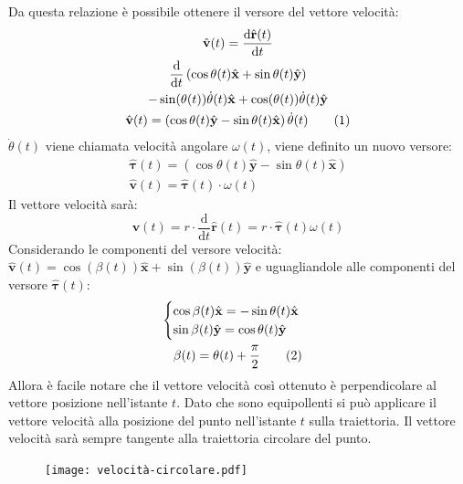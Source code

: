 \documentclass{article}
\newcommand{\vect}[1]{\boldsymbol{\mathbf{#1}}}
\newcommand{\df}{\mathrm{d}}
\numberwithin{equation}{subsection}
\begin{document}
Da questa relazione è possibile ottenere il versore del 
vettore velocità: 
\begin{gather*}
    \hat{\vect{v}}(t)=\displaystyle\frac{\df\hat{\vect{r}}(t)}{\df t}\\
    \displaystyle\frac{\df}{\df t}\left(\cos\theta(t)\hat{\vect{x}}+\sin\theta(t)\hat{\vect{y}}\right)\\
    -\sin(\theta(t))\dot\theta(t)\hat{\vect{x}}+\cos(\theta(t))\dot\theta(t)\hat{\vect{y}}\\
    \hat{\vect{v}}(t)=\left(\cos\theta(t)\hat{\vect{y}}-\sin\theta(t)\hat{\vect{x}}\right)\dot\theta(t)\tag{\stepcounter{equation}\theequation}
\end{gather*}
$\dot\theta(t)$ viene chiamata velocità angolare $\omega(t)$, 
viene definito un nuovo versore:
\begin{gather}
    \hat{\vect{\tau}}(t) =\left(\cos\theta(t)\hat{\vect{y}}-\sin\theta(t)\hat{\vect{x}}\right)\\
    \hat{\vect{v}}(t) =\hat{\vect{\tau}}(t)\cdot\omega(t)
\end{gather}
Il vettore velocità sarà: 
\begin{equation}
    \vect{v}(t)=r\cdot\frac{\df}{\df t}\hat{\vect{r}}(t)=r\cdot\hat{\vect{\tau}}(t)\omega(t)
\end{equation}
Considerando le componenti del versore velocità: 
$\hat{\vect{v}}(t)=\cos(\beta(t))\hat{\vect{x}}+\sin(\beta(t))\hat{\vect{y}}$ e 
uguagliandole alle componenti del versore $\hat{\vect{\tau}}(t)$: 
\begin{gather*}
    \begin{cases}
        \cos\beta(t)\hat{\vect{x}}=-\sin\theta(t)\hat{\vect{x}}\\
        \sin\beta(t)\hat{\vect{y}}=\cos\theta(t)\hat{\vect{y}}
    \end{cases}\\
    \beta(t)=\theta(t)+\displaystyle\frac{\pi}{2}\tag{\stepcounter{equation}\theequation}
\end{gather*}
Allora è 
facile notare che il vettore velocità così ottenuto è 
perpendicolare al vettore posizione nell'istante $t$. Dato che  
sono equipollenti si può applicare il vettore velocità 
alla posizione del punto nell'istante $t$ sulla traiettoria.
Il vettore velocità sarà sempre tangente alla traiettoria 
circolare del punto.

\begin{figure}[H]%
    \centering
    \texttt{[image: velocità-circolare.pdf]}%
\end{figure}
\end{document}
